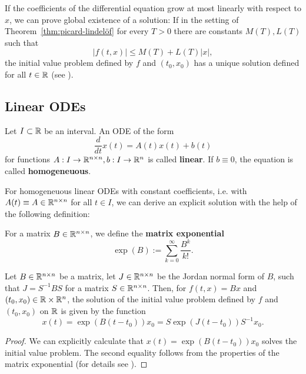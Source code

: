 \begin{rmk}\label{rmk:global_ODE_solution}
	If the coefficients of the differential equation grow at most linearly with respect to $x$, we can prove global existence of a solution: If in the setting of Theorem~\ref{thm:picard-lindelöf} for every $T>0$ there are constants $M(T), L(T)$ such that 
	$$ \vert f(t,x) \vert \leq M(T) + L(T)\vert x\vert, $$ the initial value problem defined by $f$ and $(t_0,x_0)$ has a unique solution defined for all $t\in \mathbb{R}$ (see \cite[Theorem~2.17, p.~53]{Teschl2012}).
\end{rmk}

\subsection{Linear ODEs}

\begin{definition}\label{def:linear_ODE}
	Let $I\subset \mathbb{R}$ be an interval. An ODE of the form 
	$$\frac{d}{dt} x(t) = A(t)x(t) + b(t)$$ for functions $A:I\to \mathbb{R}^{n\times n}, b: I\to \mathbb{R}^n$ is called \textbf{linear}. If $b\equiv 0$, the equation is called \textbf{homogeneuous}. 
\end{definition}

For homogeneuous linear ODEs with constant coefficients, i.e. with $A(t)\equiv A \in \mathbb{R}^{n\times n}$ for all $t\in I$, we can derive an explicit solution with the help of the following definition: 

\begin{definition}\label{def:matrix-exponential}
	For a matrix $B\in \mathbb{R}^{n\times n}$, we define the \textbf{matrix exponential}
	$$
	\exp(B) := \sum_{k=0}^{\infty} \frac{B^k}{k!}. 
	$$
\end{definition}

\begin{theorem}\label{thm:ODE-solution_linear_homogenous_multidimensional}
	Let $B\in \mathbb{R}^{n\times n}$ be a matrix, let $J\in \mathbb{R}^{n\times n}$ be the Jordan normal form of $B$, such that $J = S^{-1}BS$ for a matrix $S\in \mathbb{R}^{n\times n}$. Then, for $f(t,x) = Bx$ and $(t_0,x_0)\in \mathbb{R}\times \mathbb{R}^n$, the solution of the initial value problem defined by $f$ and $(t_0,x_0)$ on $\mathbb{R}$ is given by the function 
	$$
	x(t) = \exp(B(t-t_0))x_0 = S\exp(J(t-t_0))S^{-1}x_0. 
	$$
	\begin{proof}
		We can explicitly calculate that $x(t) = \exp(B(t-t_0))x_0$ solves the initial value problem. The second equality follows from the properties of the matrix exponential (for details see \cite[Section~3.1, pp.~59-64]{Teschl2012}). 
	\end{proof}
\end{theorem}

